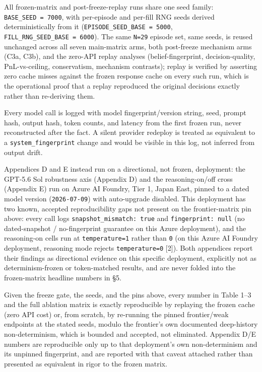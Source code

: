 \documentclass[
  10pt,
]{article}
\begin{document}
All frozen-matrix and post-freeze-replay runs share one seed family: \texttt{BASE\_SEED\ =\ 7000}, with per-episode and per-fill RNG seeds derived deterministically from it (\texttt{EPISODE\_SEED\_BASE\ =\ 5000}, \texttt{FILL\_RNG\_SEED\_BASE\ =\ 6000}). The same \texttt{N=29} episode set, same seeds, is reused unchanged across all seven main-matrix arms, both post-freeze mechanism arms (C3a, C3b), and the zero-API replay analyses (belief-fingerprint, decision-quality, PnL-vs-ceiling, conservatism, mechanism contrasts); replay is verified by asserting zero cache misses against the frozen response cache on every such run, which is the operational proof that a replay reproduced the original decisions exactly rather than re-deriving them.

Every model call is logged with model fingerprint/version string, seed, prompt hash, output hash, token counts, and latency from the first frozen run, never reconstructed after the fact. A silent provider redeploy is treated as equivalent to a \texttt{system\_fingerprint} change and would be visible in this log, not inferred from output drift.

Appendices D and E instead run on a directional, not frozen, deployment: the GPT-5.6 Sol robustness axis (Appendix D) and the reasoning-on/off cross (Appendix E) run on Azure AI Foundry, Tier 1, Japan East, pinned to a dated model version (\texttt{2026-07-09}) with auto-upgrade disabled. This deployment has two known, accepted reproducibility gaps not present on the frontier-matrix pin above: every call logs \texttt{snapshot\_mismatch:\ true} and \texttt{fingerprint:\ null} (no dated-snapshot / no-fingerprint guarantee on this Azure deployment), and the reasoning-on cells run at \texttt{temperature=1} rather than \texttt{0} (on this Azure AI Foundry deployment, reasoning mode rejects \texttt{temperature=0} {[}2{]}). Both appendices report their findings as directional evidence on this specific deployment, explicitly not as determinism-frozen or token-matched results, and are never folded into the frozen-matrix headline numbers in §5.

Given the freeze gate, the seeds, and the pins above, every number in Table 1--3 and the full ablation matrix is exactly reproducible by replaying the frozen cache (zero API cost) or, from scratch, by re-running the pinned frontier/weak endpoints at the stated seeds, modulo the frontier's own documented deep-history non-determinism, which is bounded and accepted, not eliminated. Appendix D/E numbers are reproducible only up to that deployment's own non-determinism and its unpinned fingerprint, and are reported with that caveat attached rather than presented as equivalent in rigor to the frozen matrix.
\end{document}
